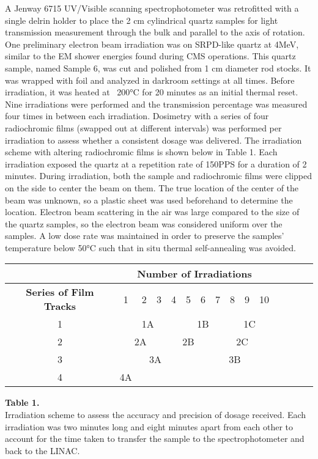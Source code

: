 \documentclass{article}
\begin{document}
A Jenway 6715 UV/Visible scanning spectrophotometer was retrofitted with a single delrin holder to place the 2 cm cylindrical quartz samples for light transmission measurement through the bulk and parallel to the axis of rotation. One preliminary electron beam irradiation was on SRPD-like quartz at 4MeV, similar to the EM shower energies found during CMS operations. This quartz sample, named Sample 6, was cut and polished from 1 cm diameter rod stocks. It was wrapped with foil and analyzed in darkroom settings at all times. Before irradiation, it was heated at ~200°C for 20 minutes as an initial thermal reset.
Nine irradiations were performed and the transmission percentage was measured four times in between each irradiation. Dosimetry with a series of four radiochromic films (swapped out at different intervals) was performed per irradiation to assess whether a consistent dosage was delivered. The irradiation scheme with altering radiochromic films is shown below in Table 1. Each irradiation exposed the quartz at a repetition rate of 150PPS for a duration of 2 minutes. During irradiation, both the sample and radiochromic films were clipped on the side to center the beam on them. The true location of the center of the beam was unknown, so a plastic sheet was used beforehand to determine the location. Electron beam scattering in the air was large compared to the size of the quartz samples, so the electron beam was considered uniform over the samples. A low dose rate was maintained in order to preserve the samples’ temperature below 50°C such that in situ thermal self-annealing was avoided.\par


\begin{center}
    \begin{tabular}{ |c|c|c|c|c|c|c|c|c|c|c|c|c|c|c| }
    \hline
    \multicolumn{1}{|c|}{ } &
    \multicolumn{10}{|c|}{\textbf{Number of Irradiations}}\\
    \hline
     \textbf{Series of Film Tracks} & 1 & 2 & 3 & 4 & 5 & 6 & 7 & 8 & 9 & 10 \\
     \hline
     1 & \multicolumn{4}{|c|}{1A} & \multicolumn{3}{|c|}{1B} & \multicolumn{3}{|c|}{1C} \\
    \hline
    2 & \multicolumn{3}{|c|}{2A} & \multicolumn{3}{|c|}{2B} & \multicolumn{4}{|c|}{2C} \\
    \hline
    3 & \multicolumn{5}{|c|}{3A} & \multicolumn{5}{|c|}{3B} \\
    \hline
    4 & \multicolumn{1}{|c|}{4A} & \multicolumn{9}{|c|}{ } \\
    \hline
    \end{tabular}
    
    \textbf{Table 1.} \\
    Irradiation scheme to assess the accuracy and precision of dosage received. Each irradiation was two minutes long and eight minutes apart from each other to account for the time taken to transfer the sample to the spectrophotometer and back to the LINAC.
\end{center}
\end{document}
